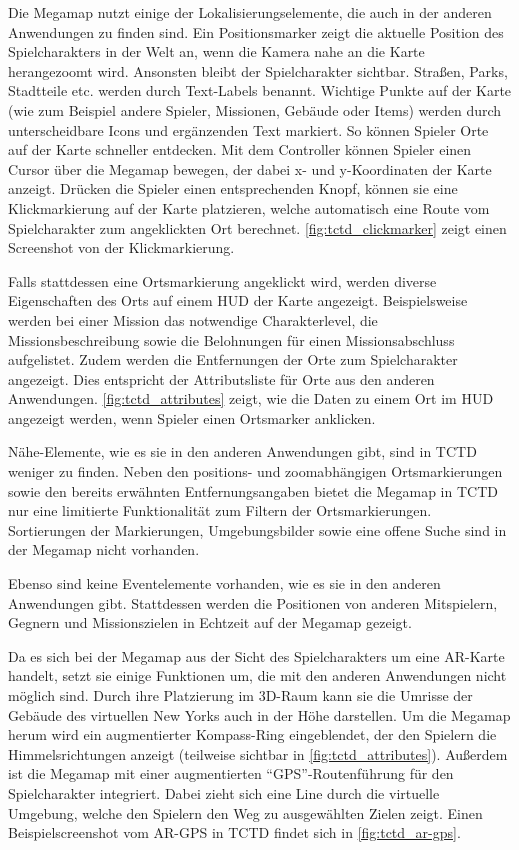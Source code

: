 Die Megamap nutzt einige der Lokalisierungselemente, die auch in der anderen Anwendungen zu finden sind.
Ein Positionsmarker zeigt die aktuelle Position des Spielcharakters in der Welt an, wenn die Kamera nahe an die Karte herangezoomt wird.
Ansonsten bleibt der Spielcharakter sichtbar.
Straßen, Parks, Stadtteile etc. werden durch Text-Labels benannt.
Wichtige Punkte auf der Karte (wie zum Beispiel andere Spieler, Missionen, Gebäude oder Items) werden durch unterscheidbare Icons und ergänzenden Text markiert.
So können Spieler Orte auf der Karte schneller entdecken.
Mit dem Controller können Spieler einen Cursor über die Megamap bewegen, der dabei x- und y-Koordinaten der Karte anzeigt.
Drücken die Spieler einen entsprechenden Knopf, können sie eine Klickmarkierung auf der Karte platzieren, welche automatisch eine Route vom Spielcharakter zum angeklickten Ort berechnet.
\autoref{fig:tctd_clickmarker} zeigt einen Screenshot von der Klickmarkierung.

Falls stattdessen eine Ortsmarkierung angeklickt wird, werden diverse Eigenschaften des Orts auf einem HUD der Karte angezeigt.
Beispielsweise werden bei einer Mission das notwendige Charakterlevel, die Missionsbeschreibung sowie die Belohnungen für einen Missionsabschluss aufgelistet.
Zudem werden die Entfernungen der Orte zum Spielcharakter angezeigt.
Dies entspricht der Attributsliste für Orte aus den anderen Anwendungen.
\autoref{fig:tctd_attributes} zeigt, wie die Daten zu einem Ort im HUD angezeigt werden, wenn Spieler einen Ortsmarker anklicken.

Nähe-Elemente, wie es sie in den anderen Anwendungen gibt, sind in TCTD weniger zu finden.
Neben den positions- und zoomabhängigen Ortsmarkierungen sowie den bereits erwähnten Entfernungsangaben bietet die Megamap in TCTD nur eine limitierte Funktionalität zum Filtern der Ortsmarkierungen.
Sortierungen der Markierungen, Umgebungsbilder sowie eine offene Suche sind in der Megamap nicht vorhanden.

Ebenso sind keine Eventelemente vorhanden, wie es sie in den anderen Anwendungen gibt.
Stattdessen werden die Positionen von anderen Mitspielern, Gegnern und Missionszielen in Echtzeit auf der Megamap gezeigt.

Da es sich bei der Megamap aus der Sicht des Spielcharakters um eine AR-Karte handelt, setzt sie einige Funktionen um, die mit den anderen Anwendungen nicht möglich sind.
Durch ihre Platzierung im 3D-Raum kann sie die Umrisse der Gebäude des virtuellen New Yorks auch in der Höhe darstellen.
Um die Megamap herum wird ein augmentierter Kompass-Ring eingeblendet, der den Spielern die Himmelsrichtungen anzeigt (teilweise sichtbar in \autoref{fig:tctd_attributes}).
Außerdem ist die Megamap mit einer augmentierten \enquote{GPS}-Routenführung für den Spielcharakter integriert.
Dabei zieht sich eine Line durch die virtuelle Umgebung, welche den Spielern den Weg zu ausgewählten Zielen zeigt.
Einen Beispielscreenshot vom AR-GPS in TCTD findet sich in \autoref{fig:tctd_ar-gps}.

